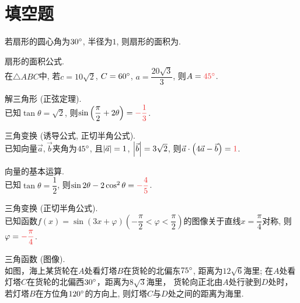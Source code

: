 \documentclass[8pt]{article}
\author{\Author}
\title{\Title}
\date{}
\begin{document}
	\maketitle

	\section{填空题}
		 若扇形的圆心角为\(30^\circ\), 半径为\(1\), 则扇形的面积为.

		 扇形的面积公式.
		~\\

		 在\(\triangle ABC\)中, 若\(c = 10\sqrt{2}\), \(C = 60^\circ\), \(a = \dfrac{20\sqrt{3}}{3}\), 则\(A = \ansmath{45\degree}\).

		 解三角形 (正弦定理).
		~\\

		 已知\(\tan \theta = \sqrt{2}\), 则\(\sin \left(\dfrac{\pi}{2} + 2\theta\right) = \ansmath{-\dfrac{1}{3}}\).

		 三角变换 (诱导公式, 正切半角公式).
		~\\

		 已知向量\(\vec{a}, \vec{b}\)夹角为\(45^\circ\), 且\(\left\lvert \vec{a} \right\rvert = 1\), \(\left\lvert \vec{b} \right\rvert = 3\sqrt{2}\), 则\(\vec{a} \cdot \left(4\vec{a} - \vec{b}\right) = \ansmath{1}\).

		 向量的基本运算.
		~\\

		 已知\(\tan \theta = \dfrac{1}{2}\), 则\(\sin 2\theta - 2\cos^2 \theta = \ansmath{-\dfrac{4}{5}}\).

		 三角变换 (正切半角公式).
		~\\

		 已知函数\(f(x) = \sin \left(3x + \varphi\right) \left(-\dfrac{\pi}{2} < \varphi < \dfrac{\pi}{2}\right)\)的图像关于直线\(x = \dfrac{\pi}{4}\)对称, 则\(\varphi = \ansmath{-\dfrac{\pi}{4}}\).

		 三角函数 (图像).
		~\\

		 如图，海上某货轮在\(A\)处看灯塔\(B\)在货轮的北偏东\(75^\circ\), 距离为\(12\sqrt{6}\)海里; 在\(A\)处看灯塔\(C\)在货轮的北偏西\(30^\circ\)，距离为\(8\sqrt{3}\)海里， 货轮向正北由\(A\)处行驶到\(D\)处时，若灯塔\(B\)在方位角\(120^\circ\)的方向上, 则灯塔\(C\)与\(D\)处之间的距离为海里.
\end{document}
